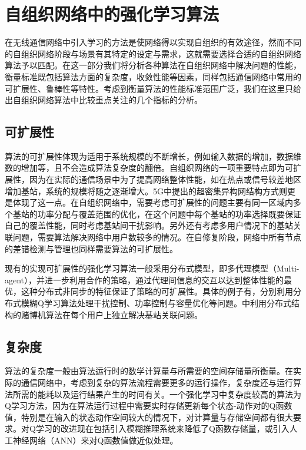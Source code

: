 ﻿\documentclass[11pt,draftclsnofoot,onecolumn,journal,letterpaper]{IEEEtran}
\begin{document}
\section{自组织网络中的强化学习算法}
\label{sec:Compare}
在无线通信网络中引入学习的方法是使网络得以实现自组织的有效途径，然而不同的自组织网络阶段与场景有其特定的设定与需求，这就需要选择合适的自组织网络算法予以匹配。在这一部分我们将分析各种算法在自组织网络中解决问题的性能，衡量标准既包括算法方面的复杂度，收敛性能等因素，同样包括通信网络中常用的可扩展性、鲁棒性等特性。考虑到衡量算法的性能标准范围广泛，我们在这里只给出自组织网络算法中比较重点关注的几个指标的分析。
\subsection{可扩展性}
算法的可扩展性体现为适用于系统规模的不断增长，例如输入数据的增加，数据维数的增加等，且不会造成算法复杂度的翻倍。自组织网络的一项重要特点即为可扩展性，因为在实际的通信场景中为了提高网络整体性能，如在热点或信号较差地区增加基站，系统的规模将随之逐渐增大。5G中提出的超密集异构网结构方式则更是体现了这一点。在自组织网络中，需要考虑可扩展性的问题主要有同一区域内多个基站的功率分配与覆盖范围的优化，在这个问题中每个基站的功率选择既要保证自己的覆盖性能，同时考虑基站间干扰影响。另外还有考虑多用户情况下的基站关联问题，需要算法解决网络中用户数较多的情况。在自修复阶段，网络中所有节点的差错检测与管理也同样需要算法的可扩展性。

现有的实现可扩展性的强化学习算法一般采用分布式模型，即多代理模型（Multi-agent），并进一步利用合作的策略，通过代理间信息的交互以达到整体性能的最优，这种分布式非同步的特征保证了策略的可扩展性。具体的例子有\cite{Dirani2010}\cite{Fan2014}\cite{Islam2012}，分别利用分布式模糊Q学习算法处理干扰控制、功率控制与容量优化等问题。\cite{Maghsudi2017}中利用分布式结构的赌博机算法在每个用户上独立解决基站关联问题。

\subsection{复杂度}
算法的复杂度一般由算法运行时的数学计算量与所需要的空间存储量所衡量。在实际的通信网络中，考虑到复杂的算法流程需要更多的运行操作，复杂度还与运行算法所需的能耗以及运行结果产生的时间有关。一个强化学习中复杂度较高的算法为Q学习方法，因为在算法运行过程中需要实时存储更新每个状态-动作对的Q函数值，特别是在输入的状态动作空间较大的情况下，对计算量与存储空间都有很大要求。对Q学习的改进现在包括引入模糊推理系统来降低了Q函数存储量，或引入人工神经网络（ANN）来对Q函数值做近似处理\cite{Ghadimi2017}。
\end{document}
